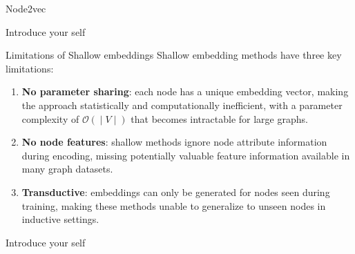 \documentclass[aspectratio=169]{beamer}
\renewcommand{\alert}[1]{\textbf{\color{swufe}#1}}
\begin{document}
\begin{frame}{Node2vec}

            \begin{note}
                {Introduce your self}
            \end{note}
        \end{frame}
        
        \begin{frame}{Limitations of Shallow embeddings}
            Shallow embedding methods have three key limitations:

            \begin{enumerate}
                \item \alert{No parameter sharing}: each node has a unique embedding vector, making the approach statistically and computationally inefficient, with a parameter complexity of $\mathcal{O} (∣V∣)$ that becomes intractable for large graphs. %
                \item \alert{No node features}: shallow methods ignore node attribute information during encoding, missing potentially valuable feature information available in many graph datasets.
                \item \alert{Transductive}: embeddings can only be generated for nodes seen during training, making these methods unable to generalize to unseen nodes in inductive settings.
            \end{enumerate}

            \begin{note}
                {Introduce your self}
            \end{note}
        \end{frame}
\end{document}
